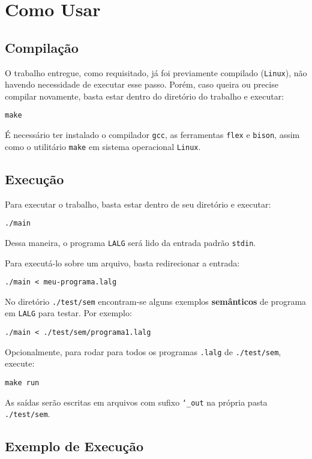 \section{Como Usar \label{sec:como-usar}}

\subsection{Compilação}

O trabalho entregue, como requisitado, já foi previamente compilado (\texttt{Linux}), não havendo necessidade de executar esse passo. Porém, caso queira ou precise compilar novamente, basta estar dentro do diretório do trabalho e executar:

	\indent\indent\texttt{make}

É necessário ter instalado o compilador \texttt{gcc}, as ferramentas \texttt{flex} e \texttt{bison}, assim como o utilitário \texttt{make} em sistema operacional \texttt{Linux}.

\subsection{Execução}

Para executar o trabalho, basta estar dentro de seu diretório e executar:

	\indent\indent\texttt{./main}

Dessa maneira, o programa \texttt{LALG} será lido da entrada padrão \texttt{stdin}.

Para executá-lo sobre um arquivo, basta redirecionar a entrada:

	\indent\indent\texttt{./main < meu-programa.lalg}

No diretório \texttt{./test/sem} encontram-se alguns exemplos \textbf{semânticos} de programa em \texttt{LALG} para testar. Por exemplo:

	\indent\indent\texttt{./main < ./test/sem/programa1.lalg}

Opcionalmente, para rodar para todos os programas \texttt{.lalg} de \texttt{./test/sem}, execute:

	\indent\indent\texttt{make run}

As saídas serão escritas em arquivos com sufixo \texttt{\char`_out} na própria pasta \texttt{./test/sem}.

\newpage
\subsection{Exemplo de Execução}

